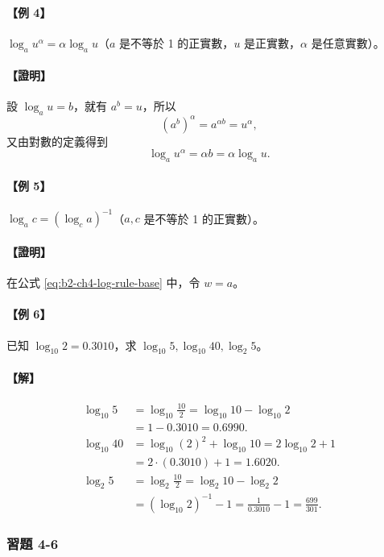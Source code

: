 \paragraph{【例 4】} $\log_a u^\alpha = \alpha\log_a u$（$a$ 是不等於 1 的正實數，$u$ 是正實數，$\alpha$ 是任意實數）。\\
\paragraph{【證明】} 設 $\log_a u = b$，就有 $a^b = u$，所以
\[
(a^b)^\alpha = a^{\alpha b} = u^\alpha,
\]
又由對數的定義得到
\[
\log_a u^\alpha = \alpha b = \alpha\log_a u.
\]

\paragraph{【例 5】} $\log_a c = (\log_c a)^{-1}$（$a, c$ 是不等於 1 的正實數）。\\
\paragraph{【證明】} 在公式 \eqref{eq:b2-ch4-log-rule-base} 中，令 $w = a$。

\paragraph{【例 6】} 已知 $\log_{10} 2 = 0.3010$，求 $\log_{10} 5, \log_{10} 40, \log_2 5$。\\
\paragraph{【解】}
\begin{align*}
\log_{10} 5 &= \log_{10} \frac{10}{2} = \log_{10} 10 - \log_{10} 2 \\
&= 1 - 0.3010 = 0.6990. \\
\log_{10} 40 &= \log_{10}(2)^2 + \log_{10} 10 = 2\log_{10} 2 + 1 \\
&= 2\cdot(0.3010) + 1 = 1.6020. \\
\log_2 5 &= \log_2 \frac{10}{2} = \log_2 10 - \log_2 2 \\
&= (\log_{10} 2)^{-1} - 1 = \frac{1}{0.3010} - 1 = \frac{699}{301}.
\end{align*}

\subsubsection*{習題 4-6}

